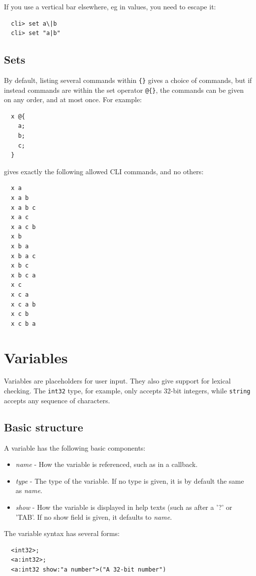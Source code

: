 \documentclass[a4paper, 10pt] {article}
\begin{document}
If you use a vertical bar elsewhere, eg in values, you need to escape it:
\begin{verbatim}
  cli> set a\|b
  cli> set "a|b"
\end{verbatim}

\subsection{Sets}
\label{sec:sets}
By default, listing several commands within {\tt \{\}} gives a choice of commands, but if instead commands are within the set operator {\tt @\{\}}, the commands can be given on any order, and at most once. For example:
\begin{verbatim}
  x @{
    a;
    b;
    c;
  }
\end{verbatim}

gives exactly the following allowed CLI commands, and no others:
\begin{verbatim}
  x a
  x a b
  x a b c
  x a c
  x a c b
  x b
  x b a
  x b a c
  x b c
  x b c a
  x c
  x c a
  x c a b
  x c b
  x c b a
\end{verbatim}

\section{Variables}
\label{sec:variables}
Variables are placeholders for user input. They also give support for
lexical checking. The {\tt int32} type, for example, only
accepts 32-bit integers, while {\tt string} accepts any sequence of
characters. 

\subsection{Basic structure}

A variable has the following basic components:
\begin{itemize}
\item {\em name} - How the variable is referenced, such as in a callback.
\item {\em type} - The type of the variable. If no type is given, it is by default the same as {\em name}.
\item {\em show} - How the variable is displayed in help texts (such as after a '?' or 'TAB'. If no show field is given,  it defaults to {\em name}.
\end{itemize}

The variable syntax has several forms:
\begin{verbatim}
  <int32>;                
  <a:int32>;              
  <a:int32 show:"a number">("A 32-bit number")
\end{verbatim}
\end{document}
